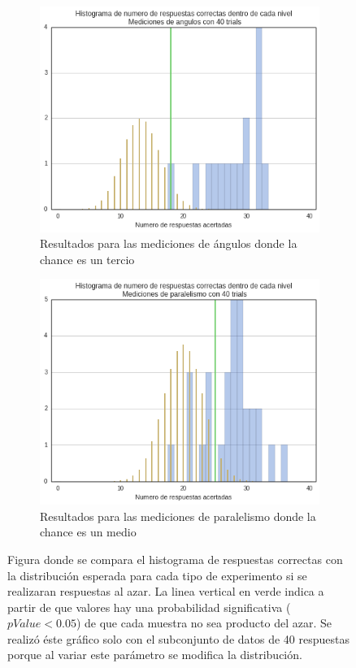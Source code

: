 \documentclass{article}
\numberwithin{figure}{section}
\begin{document}
	
	\begin{figure}
        \begin{subfigure}{.5\textwidth}
            \centering
            \includegraphics[width=\textwidth]{Imagenes/Exp1_Validas40A.png}
            \caption{Resultados para las mediciones de ángulos donde la chance es un tercio}
            \label{fig:sfig1}
        \end{subfigure}
        \begin{subfigure}{.5\textwidth}
            \centering
            \includegraphics[width=\textwidth]{Imagenes/Exp1_Validas40P.png}
            \caption{Resultados para las mediciones de paralelismo donde la chance es un medio}
            \label{fig:sfig2}
        \end{subfigure}
        \caption{Figura donde se compara el histograma de respuestas correctas con la distribución esperada para cada tipo de experimento si se realizaran respuestas al azar. La linea vertical en verde indica a partir de que valores hay una probabilidad significativa ($pValue<0.05$) de que cada muestra no sea producto del azar. Se realizó éste gráfico solo con el subconjunto de datos de 40 respuestas porque al variar este parámetro se modifica la distribución.}
        \label{fig:Exp1_Significancia}
    \end{figure}
\end{document}
